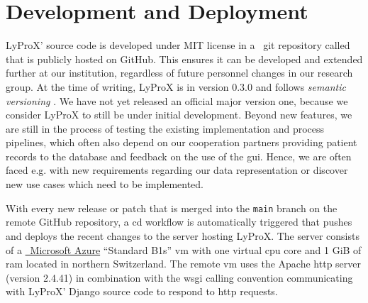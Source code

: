 \documentclass[\relativeRoot/main.tex]{subfiles}
\begin{document}
\section{Development and Deployment}
\label{sec:lyprox:dev}

LyProX' source code is developed under MIT license in a ~git \cite{torvalds_git_2022} repository called  that is publicly hosted on GitHub. This ensures it can be developed and extended further at our institution, regardless of future personnel changes in our research group. At the time of writing, LyProX is in version 0.3.0 and follows \emph{semantic versioning} \cite{preston-werner_semantic_nodate}. We have not yet released an official major version one, because we consider LyProX to still be under initial development. Beyond new features, we are still in the process of testing the existing implementation and process pipelines, which often also depend on our cooperation partners providing patient records to the database and feedback on the use of the \gls{gui}. Hence, we are often faced e.g. with new requirements regarding our data representation or discover new use cases which need to be implemented.

With every new release or patch that is merged into the \texttt{main} branch on the remote GitHub repository, a \acrlong{cd} workflow is automatically triggered that pushes and deploys the recent changes to the server hosting LyProX. The server consists of a \href{https://azure.microsoft.com/}{~Microsoft Azure} ``Standard B1s'' \acrlong{vm} with one virtual \acrshort{cpu} core and 1 GiB of \acrshort{ram} located in northern Switzerland. The remote \acrlong{vm} uses the Apache \acrshort{http} server (version 2.4.41) \cite{mccool_apache_nodate} in combination with the \acrshort{wsgi} calling convention \cite{eby_python_2010} communicating with LyProX' Django source code to respond to \acrshort{http} requests.
\end{document}
